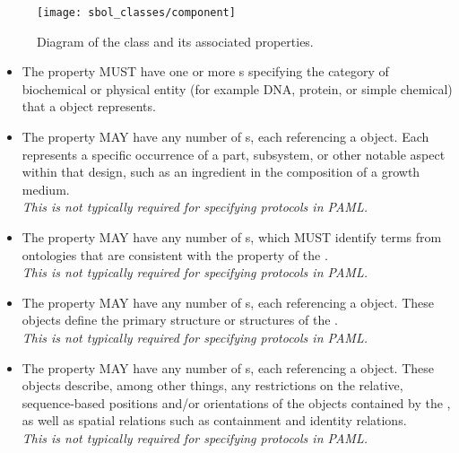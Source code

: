 \begin{figure}[ht]
\begin{center}
\texttt{[image: sbol\_classes/component]}
\caption[]{Diagram of the  class and its associated properties.}
\label{uml:component}
\end{center}
\end{figure} 

\begin{itemize}
\item \label{sec:sbol:type:C}
The  property MUST have one or more s specifying the category of biochemical or physical entity (for example DNA, protein, or simple chemical) that a  object represents.

\item \label{sec:sbol:hasFeature}
The  property MAY have any number of s, each referencing a  object. Each  represents a specific occurrence of a part, subsystem, or other notable aspect within that design, such as an ingredient in the composition of a growth medium.
\\{\em This is not typically required for specifying protocols in PAML.}

\item \label{sec:sbol:role:C}
The  property MAY have any number of s, which MUST identify terms from ontologies that are consistent with the  property of the . 
\\{\em This is not typically required for specifying protocols in PAML.}

\item \label{sec:sbol:hasSequence:C}
The  property MAY have any number of s, each referencing a  object.  These objects define the primary structure or structures of the .
\\{\em This is not typically required for specifying protocols in PAML.}

\item \label{sec:sbol:hasConstraint}
The  property MAY have any number of s, each referencing a  object.
These objects describe, among other things, any restrictions on the relative, sequence-based positions and/or orientations of the  objects contained by the , as well as spatial relations such as containment and identity relations.
\\{\em This is not typically required for specifying protocols in PAML.}


\end{itemize}
